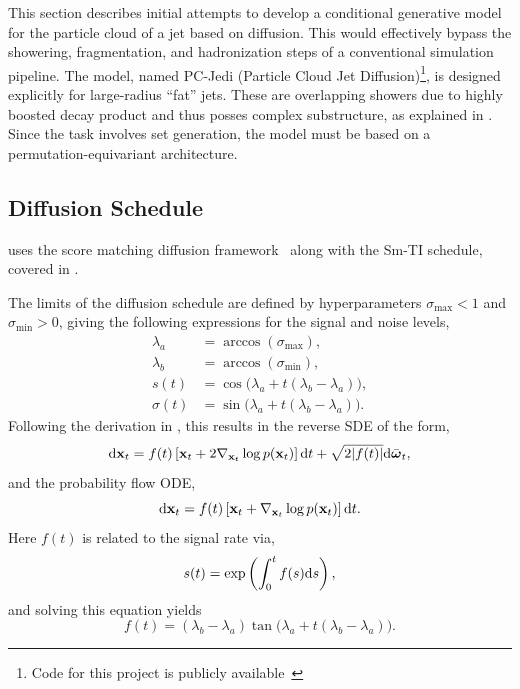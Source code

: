 This section describes initial attempts to develop a conditional generative model for the particle cloud of a jet based on diffusion.
This would effectively bypass the showering, fragmentation, and hadronization steps of a conventional simulation pipeline.
The model, named PC-Jedi (Particle Cloud Jet Diffusion)\footnote{Code for this project is publicly available~\cite{PCJediCode}}, is designed explicitly for large-radius ``fat'' jets.
These are overlapping showers due to highly boosted decay product and thus posses complex substructure, as explained in .
Since the task involves set generation, the model must be based on a permutation-equivariant architecture.

\subsection{Diffusion Schedule}

\pcjedi uses the score matching diffusion framework~\cite{ScoreBasedGenerativeModeling} along with the Sm-TI schedule, covered in .

The limits of the diffusion schedule are defined by hyperparameters $\sigma_\text{max}<1$ and $\sigma_\text{min}>0$, giving the following expressions for the signal and noise levels,
\begin{align}
    \lambda_a & = \arccos(\sigma_\text{max}),                           \\
    \lambda_b & = \arccos(\sigma_\text{min}),                           \\
    s(t)      & = \cos\bigl(\lambda_a + t(\lambda_b - \lambda_a)\bigr), \\
    \sigma(t) & = \sin\bigl(\lambda_a + t(\lambda_b - \lambda_a)\bigr).
\end{align}
Following the derivation in , this results in the reverse SDE of the form,
\begin{equation}
    \label{eq:jedi_reverse_vp_sde}
    \mathrm{d}\mathbf{x}_t = f(t) \left[ \mathbf{x}_t + 2 \nabla_{\mathbf{x}_t} \log p(\mathbf{x}_t) \right] \mathrm{d} t + \sqrt{2 |f(t)|} \mathrm{d} \bar{\boldsymbol{\omega}}_t,
\end{equation}
and the probability flow ODE,
\begin{equation}
    \label{eq:jedi_vp_ode}
    \mathrm{d} \mathbf{x}_t = f(t) \left[ \mathbf{x}_t + \nabla_{\mathbf{x}_t} \log p(\mathbf{x}_t) \right] \mathrm{d} t.
\end{equation}
Here $f(t)$ is related to the signal rate via,
\begin{equation}
    s(t) = \exp\left(\int_0^t f(s) \mathrm{d} s\right),
\end{equation}
and solving this equation yields
\begin{equation}
    f(t) = (\lambda_b - \lambda_a) \tan\bigl(\lambda_a + t(\lambda_b - \lambda_a)\bigr).
\end{equation}

